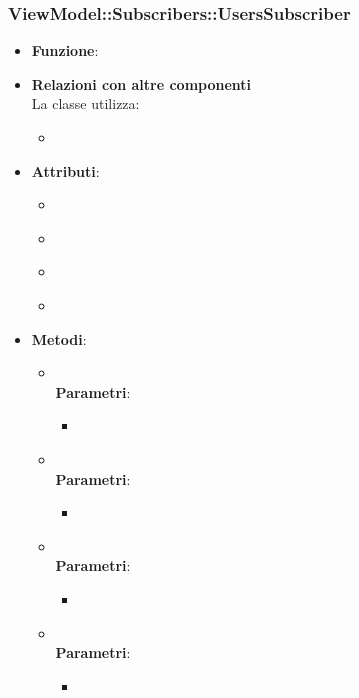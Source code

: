 \subsubsection{ViewModel::Subscribers::UsersSubscriber}
\begin{itemize}
\item\textbf{Funzione}:
\item\textbf{Relazioni con altre componenti}\\
La classe utilizza:
	\begin{itemize}
		\item
	\end{itemize}
\item\textbf{Attributi}:
	\begin{itemize}
		\item\code{}\\
		\item\code{}\\
		\item\code{}\\
		\item\code{}\\
	\end{itemize}
\item\textbf{Metodi}:
	\begin{itemize}
		\item\code{}\\
		\textbf{Parametri}:
			\begin{itemize}
				\item\code{}\\
			\end{itemize}
		\item\code{}\\
		\textbf{Parametri}:
			\begin{itemize}
				\item\code{}\\
			\end{itemize}
		\item\code{}\\
		\textbf{Parametri}:
			\begin{itemize}
				\item\code{}\\
			\end{itemize}
		\item\code{}\\
		\textbf{Parametri}:
			\begin{itemize}
				\item\code{}\\
			\end{itemize}
	\end{itemize}
\end{itemize}

